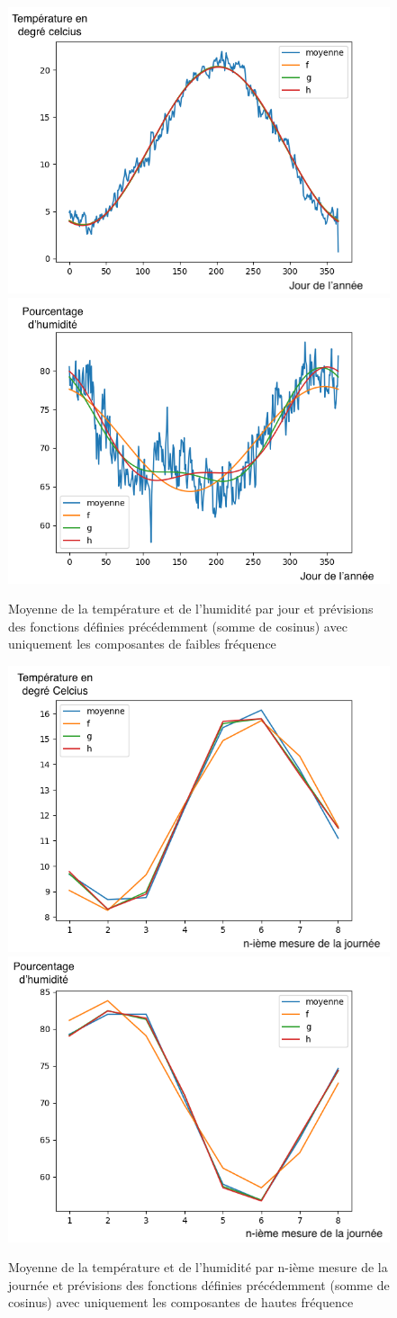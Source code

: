 \documentclass[11pt,a4paper]{article}
\begin{document}
\begin{figure} [H]
\centering
\includegraphics[width=0.48 \textwidth]{./imagesTIPE/CourbeAnneeT.png}\quad
\includegraphics[width=0.48 \textwidth]{./imagesTIPE/CourbeAnneeH.png}
\caption{\label{fig:190101Lolita} Moyenne de la température et de l'humidité par jour et prévisions des fonctions définies précédemment (somme de cosinus) avec uniquement les composantes de faibles fréquence}
\end{figure}
\begin{figure} [H]
\centering
\includegraphics[width=0.48 \textwidth]{./imagesTIPE/CourbeJourneeT.png}\quad
\includegraphics[width=0.48 \textwidth]{./imagesTIPE/CourbeJourneeH.png}
\caption{\label{fig:190101Lolita} Moyenne de la température et de l'humidité par n-ième mesure de la journée et prévisions des fonctions définies précédemment (somme de cosinus) avec uniquement les composantes de hautes fréquence }
\end{figure}
\end{document}
